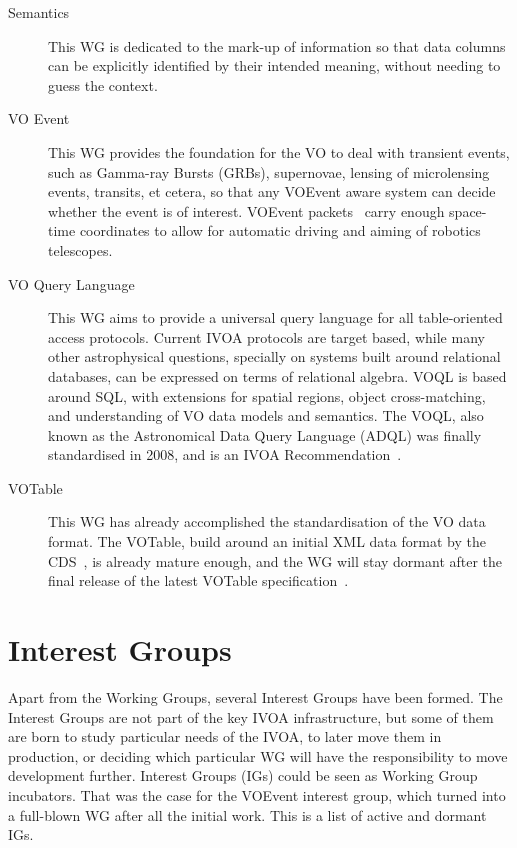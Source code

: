\begin{description}
			 \item[Semantics] This WG is dedicated to the mark-up
			of information so that data columns can be explicitly
			identified by their intended meaning, without needing
			to guess the context.
			
			 \item[VO Event] This WG provides the foundation for
			the VO to deal with transient events, such as Gamma-ray
			Bursts (GRBs), supernovae, lensing of microlensing
			events, transits, et cetera, so that any VOEvent aware
			system can decide whether the event is of interest.
			VOEvent packets~\cite{2006AN....327..775W} carry enough
			space-time coordinates to allow for automatic driving
			and aiming of robotics telescopes.
			
			 \item[VO Query Language] This WG aims to provide a
			universal query language for all table-oriented access
			protocols. Current IVOA protocols are target based,
			while many other astrophysical questions, specially on
			systems built around relational databases, can be
			expressed on terms of relational algebra. VOQL is based
			around SQL, with extensions for spatial regions, object
			cross-matching, and understanding of VO data models and
			semantics. The VOQL, also known as the Astronomical 
			Data Query Language (ADQL) was finally standardised
			in 2008, and is an IVOA
			Recommendation~\cite{2008adql.ivoav0910O}.
			
			 \item[VOTable] This WG has already accomplished the
			standardisation of the VO data format. The VOTable,
			build around an initial XML data format by the
			CDS~\cite{2000ASPC..216...83O}, is already mature
			enough, and the WG will stay dormant after the final
			release of the latest VOTable
			specification~\cite{2004votfdivoav0811O}.
		\end{description}


	\section{Interest Groups} %
	\label{sec:interest_groups}
		
		Apart from the Working Groups, several Interest Groups have
		been formed. The Interest Groups are not part of the key
		IVOA infrastructure, but some of them are born to study
		particular needs of the IVOA, to later move them in
		production, or deciding which particular WG will have the
		responsibility to move development further. Interest Groups
		(IGs) could be seen as Working Group incubators. That was
		the case for the VOEvent interest group, which turned into
		a full-blown WG after all the initial work. This is a list
		of active and dormant IGs.
		
